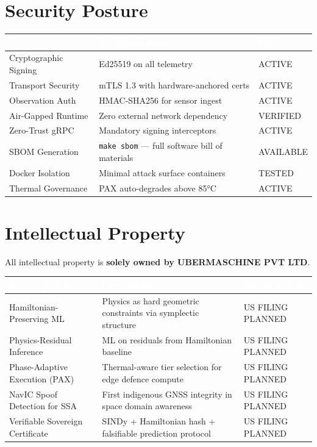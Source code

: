 \documentclass[11pt,a4paper]{article}
\newcommand{\TH}[1]{\textcolor{white}{\textbf{#1}}}
\begin{document}
\section{Security Posture}
\begin{table}[H]\centering\small
\begin{tabularx}{\textwidth}{|p{4cm}|X|p{2.5cm}|}
\hline
\rowcolor{dblue}\TH{Control} & \TH{Implementation} & \TH{Status} \\
\hline
Cryptographic Signing & Ed25519 on all telemetry & \textcolor{dgreen}{ACTIVE} \\
\hline
Transport Security & mTLS 1.3 with hardware-anchored certs & \textcolor{dgreen}{ACTIVE} \\
\hline
Observation Auth & HMAC-SHA256 for sensor ingest & \textcolor{dgreen}{ACTIVE} \\
\hline
Air-Gapped Runtime & Zero external network dependency & \textcolor{dgreen}{VERIFIED} \\
\hline
Zero-Trust gRPC & Mandatory signing interceptors & \textcolor{dgreen}{ACTIVE} \\
\hline
SBOM Generation & \texttt{make sbom} --- full software bill of materials & \textcolor{dgreen}{AVAILABLE} \\
\hline
Docker Isolation & Minimal attack surface containers & \textcolor{dgreen}{TESTED} \\
\hline
Thermal Governance & PAX auto-degrades above 85°C & \textcolor{dgreen}{ACTIVE} \\
\hline
\end{tabularx}
\end{table}

\section{Intellectual Property}

All intellectual property is \textbf{solely owned by UBERMASCHINE PVT LTD}.

\begin{table}[H]\centering\small
\begin{tabularx}{\textwidth}{|p{5cm}|X|p{3cm}|}
\hline
\rowcolor{dblue}\TH{IP Component} & \TH{Description} & \TH{Patent Status} \\
\hline
Hamiltonian-Preserving ML & Physics as hard geometric constraints via symplectic structure & \textcolor{dgold}{US FILING PLANNED} \\
\hline
Physics-Residual Inference & ML on residuals from Hamiltonian baseline & \textcolor{dgold}{US FILING PLANNED} \\
\hline
Phase-Adaptive Execution (PAX) & Thermal-aware tier selection for edge defence compute & \textcolor{dgold}{US FILING PLANNED} \\
\hline
NavIC Spoof Detection for SSA & First indigenous GNSS integrity in space domain awareness & \textcolor{dgold}{US FILING PLANNED} \\
\hline
Verifiable Sovereign Certificate & SINDy + Hamiltonian hash + falsifiable prediction protocol & \textcolor{dgold}{US FILING PLANNED} \\
\hline
\end{tabularx}
\end{table}
\end{document}
